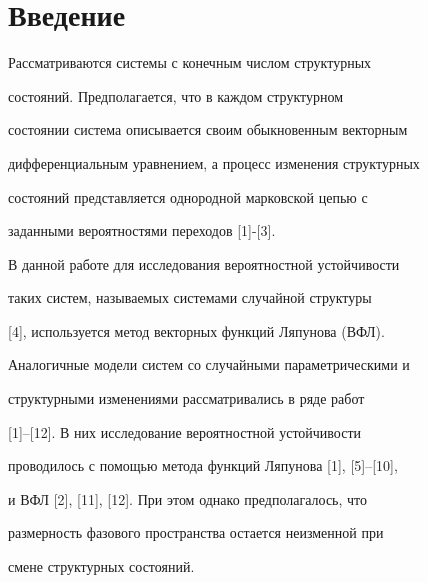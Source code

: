 \pagestyle{plain} %


 




\maketitle 


\label{begin} 


 


 


\section{Введение} 


 


Рассматриваются системы с конечным числом структурных 


состояний. Предполагается, что в каждом структурном  


состоянии система описывается своим обыкновенным векторным  


дифференциальным уравнением, а процесс изменения структурных  


состояний представляется однородной марковской цепью с 


заданными вероятностями переходов [1]-[3]. 


В данной работе для исследования вероятностной устойчивости 


таких систем, называемых системами случайной структуры 


[4], используется метод векторных функций Ляпунова (ВФЛ).  


Аналогичные модели систем со случайными параметрическими и  


структурными изменениями рассматривались в ряде работ  


[1]--[12]. В них исследование вероятностной устойчивости  


проводилось с помощью метода функций Ляпунова [1], [5]--[10],  


и ВФЛ [2], [11], [12]. При этом однако предполагалось, что  


размерность фазового пространства остается неизменной при  


смене структурных состояний. 


 


